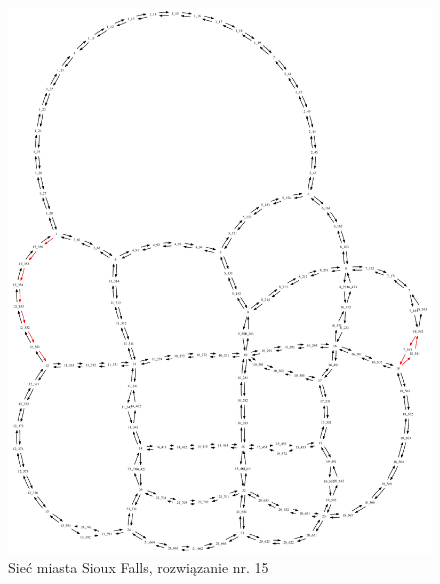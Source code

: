 \documentclass[twoside,12pt]{report}
\begin{document}
\begin{figure}[ht]
\centering
\includegraphics[totalheight=0.580\textheight, angle=90]{img/sioux-out/15/network2}
\caption{Sieć miasta Sioux Falls, rozwiązanie nr. 15}
\label{sioux15}
\end{figure}
\end{document}
